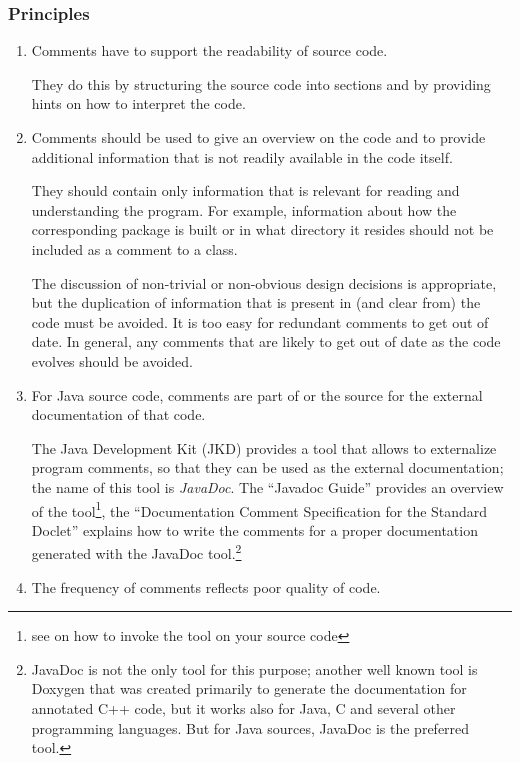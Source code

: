 \documentclass[11pt,a4paper, titlepage, parskip=half, headsepline, footsepline, cleardoublepage=current, headheight=1cm]{scrbook}
\begin{document}
\subsubsection{Principles}
\begin{enumerate}[label=P\arabic*.]
\item{Comments have to support the readability of source code.

They do this by structuring the source code into sections and by providing hints on how to interpret the code.}

\item{Comments should be used to give an overview on the code and to provide additional information that is not readily available in the code itself.

They should contain only information that is relevant for reading and understanding the program. For example, information about how the corresponding package is built or in what directory it resides should not be included as a comment to a class.

The discussion of non-trivial or non-obvious design decisions is appropriate, but the duplication of information that is present in (and clear from) the code must be avoided. It is too easy for redundant comments to get out of date. In general, any comments that are likely to get out of date as the code evolves should be avoided.}

\item{For Java source code, comments are part of or the source for the external documentation of that code.

The Java Development Kit (JKD) provides a tool that allows to externalize program comments, so that they can be used as the external documentation; the name of this tool is \textit{JavaDoc}. The “Javadoc Guide”\autocite{ORACLE_DOC_JAVADOC_GUIDE} provides an overview of the tool\footnote{see \autocite{ORACLE_DOC_JAVADOC_MAN} on how to invoke the tool on your source code}, the “Documentation Comment Specification for the Standard Doclet”\autocite{ORACLE_DOC_JAVADOC_TAG} explains how to write the comments for a proper documentation generated with the JavaDoc tool.\footnote{JavaDoc is not the only tool for this purpose; another well known tool is Doxygen\autocite{DOXYGEN_HOMEPAGE} that was created primarily to generate the documentation for annotated C++ code, but it works also for Java, C and several other programming languages. But for Java sources, JavaDoc is the preferred tool.}}

\item{The frequency of comments reflects poor quality of code.

}
\end{enumerate}
\end{document}
